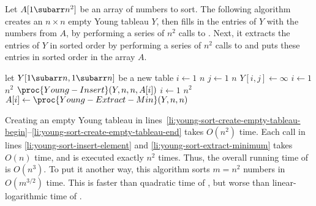 Let $A[1\subarr n^2]$ be an array of numbers to sort.
The following algorithm creates an $n\times n$ empty Young tableau $Y$, then fills in the entries of $Y$ with the numbers from $A$, by performing a series of $n^2$ calls to .
Next, it extracts the entries of $Y$ in sorted order by performing a series of $n^2$ calls to  and puts these entries in sorted order in the array $A$.

\begin{codebox}
\li let $Y[1\subarr n,1\subarr n]$ be a new table \label{li:young-sort-create-empty-tableau-begin}
\li \For $i\gets1$ \To $n$
\li     \Do \For $j\gets1$ \To $n$
\li             \Do $Y[i,j]\gets\infty$
                \End
        \End \label{li:young-sort-create-empty-tableau-end}
\li \For $i\gets1$ \To $n^2$
\li     \Do $\proc{Young-Insert}(Y,n,n,A[i])$ \label{li:young-sort-insert-element}
        \End
\li \For $i\gets1$ \To $n^2$
\li     \Do $A[i]\gets\proc{Young-Extract-Min}(Y,n,n)$ \label{li:young-sort-extract-minimum}
        \End
\end{codebox}

Creating an empty Young tableau in lines~\ref{li:young-sort-create-empty-tableau-begin}--\ref{li:young-sort-create-empty-tableau-end} takes $O(n^2)$ time.
Each call in lines \ref{li:young-sort-insert-element} and \ref{li:young-sort-extract-minimum} takes $O(n)$ time, and is executed exactly $n^2$ times.
Thus, the overall running time of  is $O(n^3)$.
To put it another way, this algorithm sorts $m=n^2$ numbers in $O(m^{3/2})$ time.
This is faster than quadratic time of , but worse than linear-logarithmic time of .
